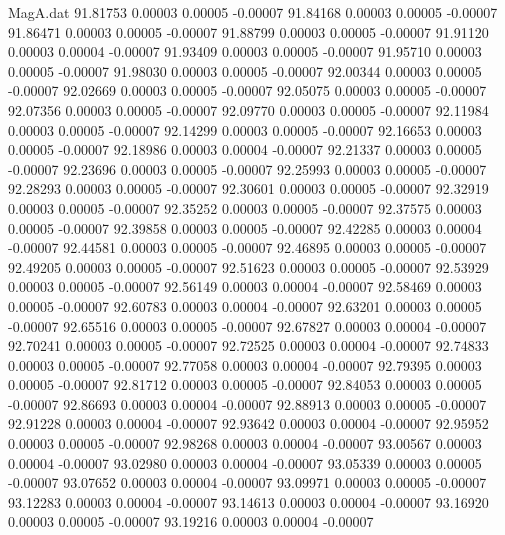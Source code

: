 \begin{filecontents}{MagA.dat}
  91.81753    0.00003    0.00005   -0.00007
  91.84168    0.00003    0.00005   -0.00007
  91.86471    0.00003    0.00005   -0.00007
  91.88799    0.00003    0.00005   -0.00007
  91.91120    0.00003    0.00004   -0.00007
  91.93409    0.00003    0.00005   -0.00007
  91.95710    0.00003    0.00005   -0.00007
  91.98030    0.00003    0.00005   -0.00007
  92.00344    0.00003    0.00005   -0.00007
  92.02669    0.00003    0.00005   -0.00007
  92.05075    0.00003    0.00005   -0.00007
  92.07356    0.00003    0.00005   -0.00007
  92.09770    0.00003    0.00005   -0.00007
  92.11984    0.00003    0.00005   -0.00007
  92.14299    0.00003    0.00005   -0.00007
  92.16653    0.00003    0.00005   -0.00007
  92.18986    0.00003    0.00004   -0.00007
  92.21337    0.00003    0.00005   -0.00007
  92.23696    0.00003    0.00005   -0.00007
  92.25993    0.00003    0.00005   -0.00007
  92.28293    0.00003    0.00005   -0.00007
  92.30601    0.00003    0.00005   -0.00007
  92.32919    0.00003    0.00005   -0.00007
  92.35252    0.00003    0.00005   -0.00007
  92.37575    0.00003    0.00005   -0.00007
  92.39858    0.00003    0.00005   -0.00007
  92.42285    0.00003    0.00004   -0.00007
  92.44581    0.00003    0.00005   -0.00007
  92.46895    0.00003    0.00005   -0.00007
  92.49205    0.00003    0.00005   -0.00007
  92.51623    0.00003    0.00005   -0.00007
  92.53929    0.00003    0.00005   -0.00007
  92.56149    0.00003    0.00004   -0.00007
  92.58469    0.00003    0.00005   -0.00007
  92.60783    0.00003    0.00004   -0.00007
  92.63201    0.00003    0.00005   -0.00007
  92.65516    0.00003    0.00005   -0.00007
  92.67827    0.00003    0.00004   -0.00007
  92.70241    0.00003    0.00005   -0.00007
  92.72525    0.00003    0.00004   -0.00007
  92.74833    0.00003    0.00005   -0.00007
  92.77058    0.00003    0.00004   -0.00007
  92.79395    0.00003    0.00005   -0.00007
  92.81712    0.00003    0.00005   -0.00007
  92.84053    0.00003    0.00005   -0.00007
  92.86693    0.00003    0.00004   -0.00007
  92.88913    0.00003    0.00005   -0.00007
  92.91228    0.00003    0.00004   -0.00007
  92.93642    0.00003    0.00004   -0.00007
  92.95952    0.00003    0.00005   -0.00007
  92.98268    0.00003    0.00004   -0.00007
  93.00567    0.00003    0.00004   -0.00007
  93.02980    0.00003    0.00004   -0.00007
  93.05339    0.00003    0.00005   -0.00007
  93.07652    0.00003    0.00004   -0.00007
  93.09971    0.00003    0.00005   -0.00007
  93.12283    0.00003    0.00004   -0.00007
  93.14613    0.00003    0.00004   -0.00007
  93.16920    0.00003    0.00005   -0.00007
  93.19216    0.00003    0.00004   -0.00007

\end{filecontents}
